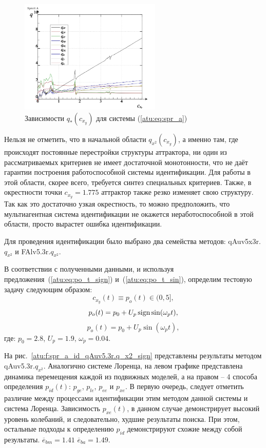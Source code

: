 \begin{figure}[htb!]
\centerline{
  \includegraphics[width=0.60\textwidth]{p/cha/spr_a/sprott_a_q-p_c_x_y.png}
}
\caption{Зависимости $q_{*}(c_{x_y})$ для системы (\ref{atu:eq:spr_a}) }
\label{atu:f:spr_a_q}
\end{figure}

Нельзя не отметить, что в начальной области
$q_{x^2}(c_{x_y}) $, а именно там, где происходят постоянные
перестройки структуры аттрактора, ни один из рассматриваемых критериев
не имеет достаточной монотонности, что не даёт гарантии
построения работоспособной системы идентификации.
Для работы в этой области, скорее всего, требуется синтез специальных критериев.
Также, в окрестности точки $c_{x_y}=1.775$ аттрактор также резко изменяет свою структуру.
Так как это достаточно узкая окрестность,
то можно предположить, что мультиагентная система идентификации
не окажется неработоспособной в этой области, просто вырастет
ошибка идентификации.

Для проведения идентификации было выбрано два семейства методов:
qAuv5x3r.$q_{x^2}$ и
FAlv5.3r.$q_{x^2}$.

В соответствии с полученными данными, и используя
предложения~(\ref{atu:eq:po_t_sign}) и~(\ref{atu:eq:po_t_sin}),
определим тестовую задачу следующим образом:
\[
  c_{x_y}(t) \equiv p_o(t) \in (0, 5],
\]
%
\begin{equation}
  p_o(t) = p_0 +  U_{p} \operatorname*{sign} \sin( \omega_{p} t ),
  \label{atu:eq:spr_a_po_t_sign}
\end{equation}
%
%
\begin{equation}
  p_o(t) = p_0 +  U_{p} \sin( \omega_{p} t ),
  \label{atu:eq:spr_a_po_t_sin}
\end{equation}
%
где:
$p_0 = 2.8$, $U_p=1.9$, $\omega_p=0.04$.

На рис.~\ref{atu:f:spr_a_id_qAuv5.3r.q_x2_sign} представлены результаты
методом qAuv5.3r.$q_{x^2}$. Аналогично системе Лоренца, на левом графике представлена
динамика перемещения каждой из подвижных моделей,
а на правом -- 4 способа определения $p_{id}(t)$:
$p_{ge}$, $p_{le}$, $p_{ee}$ и $p_{xe}$.
В первую очередь, следует отметить различие между процессами
идентификации этим методом данной системы и система Лоренца.
Зависимость $p_{xe}(t)$, в данном случае демонстрирует
высокий уровень колебаний, и следовательно,
худшие результаты поиска. При этом,
остальные подходы к определению $p_{id}$
демонстрируют схожие между собой результаты.
$\overline{e}_{bm}=1.41$
$\overline{e}_{ba}=1.49$.


